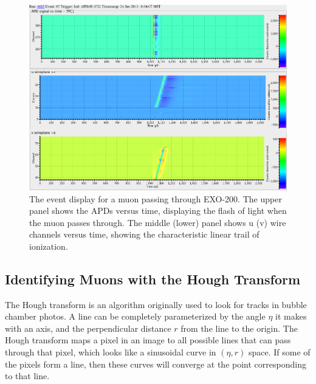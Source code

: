 \documentclass[herrin-thesis.tex]{subfiles}
\begin{document}
\begin{figure}[htbp]
\centering
\includegraphics[width=1\columnwidth]{./plots/muon_eventdisplay_run_4685_ev_67.png}
\caption[A muon passing through EXO-200]{The event display for a muon passing through EXO-200. The upper panel shows the APDs versus time, displaying the flash of light when the muon passes through. The middle (lower) panel shows u (v) wire channels versus time, showing the characteristic linear trail of ionization.}
\label{fig:muon:eventdisplay}
\end{figure}

\subsection{Identifying Muons with the Hough Transform}
The Hough transform\cite{Hough:1959fk}\cite{Duda:1972:UHT:361237.361242} is an algorithm originally used to look for tracks in bubble chamber photos. A line can be completely parameterized by the angle \(\eta\) it makes with an axis, and the perpendicular distance \(r\) from the line to the origin. The Hough transform maps a pixel in an image to all possible lines that can pass through that pixel, which looks like a sinusoidal curve in \((\eta, r)\) space. If some of the pixels form a line, then these curves will converge at the point corresponding to that line.
\end{document}

